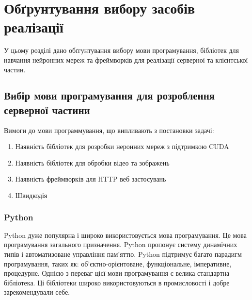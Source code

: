 
\chapter{Обґрунтування вибору засобів реалізації}

У цьому розділі дано обґгунтування вибору мови програмування, бібліотек для навчання нейронних мереж та фреймворків для реалізації серверної та клієнтської частин. 

\section{Вибір мови програмування для розроблення серверної частини}
Вимоги до мови программування, що випливають з постановки задачі:

\begin{enumerate}
    \item Наявність бібліотек для розробки неронних мереж з підтримкою CUDA
    \item Наявність бібліотек для обробки відео та зображень
    \item Наявність фреймворків для HTTP веб застосувань
    \item Швидкодія
\end{enumerate}


\subsection{Python}

Python дуже популярна і широко використовується мова програмування. Це мова програмування загального призначення. Python пропонує систему динамічних типів і автоматизоване управління пам'яттю. Python підтримує багато парадигм програмування, таких як: об'єктно-орієнтоване, функціональне, імперативне, процедурне. Однією з переваг цієї мови програмування є велика стандартна бібліотека. Ці бібліотеки широко використовуються в промисловості і добре зарекомендували себе.

